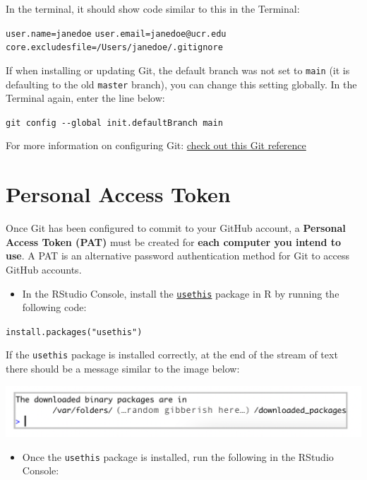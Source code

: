 \documentclass[
]{book}
\providecommand{\tightlist}{%
  \setlength{\itemsep}{0pt}\setlength{\parskip}{0pt}}
\begin{document}
In the terminal, it should show code similar to this in the Terminal:

\texttt{user.name=janedoe}
\texttt{user.email=janedoe@ucr.edu}
\texttt{core.excludesfile=/Users/janedoe/.gitignore}

If when installing or updating Git, the default branch was not set to \texttt{main} (it is defaulting to the old \texttt{master} branch), you can change this setting globally. In the Terminal again, enter the line below:

\texttt{git\ config\ -\/-global\ init.defaultBranch\ main}

For more information on configuring Git: \href{https://git-scm.com/book/en/v2/Getting-Started-First-Time-Git-Setup}{check out this Git reference}

\hypertarget{personal-access-token}{%
\section{Personal Access Token}\label{personal-access-token}}

Once Git has been configured to commit to your GitHub account, a \textbf{Personal Access Token (PAT)} must be created for \textbf{each computer you intend to use}. A PAT is an alternative password authentication method for Git to access GitHub accounts.

\begin{itemize}
\tightlist
\item
  In the RStudio Console, install the \href{https://usethis.r-lib.org/}{\texttt{usethis}} package in R by running the following code:
\end{itemize}

\texttt{install.packages("usethis")}

If the \texttt{usethis} package is installed correctly, at the end of the stream of text there should be a message similar to the image below:

\begin{flushleft}\includegraphics[width=15.39in]{images/usethis} \end{flushleft}

\begin{itemize}
\tightlist
\item
  Once the \texttt{usethis} package is installed, run the following in the RStudio Console:
\end{itemize}
\end{document}
